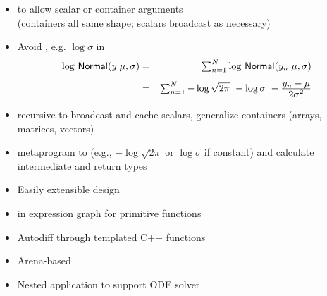 \documentclass[10pt]{report}
\begin{document}
%
\begin{itemize}
\item {} to allow scalar or container arguments
  \\ {\footnotesize (containers all same shape; scalars broadcast as necessary)}
\item Avoid , e.g. $\log \sigma$ in
  \hspace*{-18pt}
  {\small
    \begin{eqnarray*}
      \textstyle \log \, \mbox{\sf Normal}(y | \mu, \sigma)
      & = & \textstyle \sum_{n=1}^N \log \, \mbox{\sf Normal}(y_n | \mu,\sigma)
      \\[4pt]
      & = & \textstyle \sum_{n=1}^N  - \log \sqrt{2\pi} \ - \log \sigma \ -
      \frac{\textstyle y_n - \mu}{\textstyle 2\sigma^2}
    \end{eqnarray*}
  }
\item recursive  to broadcast and cache scalars,
  generalize containers (arrays, matrices, vectors)
\item {} metaprogram to  (e.g., $-\log
  \sqrt{2 \pi}$ or $\log \sigma$ if constant) 
  and calculate intermediate and return types
\end{itemize}




%
\begin{itemize}
\item Easily extensible  design
\item {} in expression graph for primitive functions
\item Autodiff through templated C++ functions
\end{itemize}


%
\begin{itemize}
\item Arena-based 
\item Nested application to support ODE solver
\end{itemize}
\end{document}
